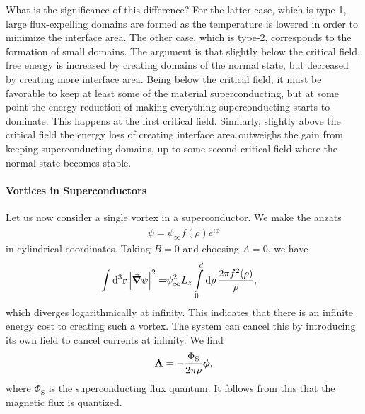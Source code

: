 What is the significance of this difference? For the latter case, which is type-1, large flux-expelling domains are formed as the temperature is lowered in order to minimize the interface area. The other case, which is type-2, corresponds to the formation of small domains. The argument is that slightly below the critical field, free energy is increased by creating domains of the normal state, but decreased by creating more interface area. Being below the critical field, it must be favorable to keep at least some of the material superconducting, but at some point the energy reduction of making everything superconducting starts to dominate. This happens at the first critical field. Similarly, slightly above the critical field the energy loss of creating interface area outweighs the gain from keeping superconducting domains, up to some second critical field where the normal state becomes stable.

\paragraph{Vortices in Superconductors}
Let us now consider a single vortex in a superconductor. We make the anzats
\begin{align*}
	\psi = \psi_{\infty}f(\rho)e^{i\phi}
\end{align*}
in cylindrical coordinates. Taking $B = 0$ and choosing $A = 0$, we have
\begin{align*}
	\int\limits_{}^{}\dd[3]{\vb{r}}\abs{\grad{\psi}}^{2} =& \psi_{\infty}^{2}L_{z}\int\limits_{0}^{d}\dd{\rho}\frac{2\pi f^{2}(\rho)}{\rho},
\end{align*}
which diverges logarithmically at infinity. This indicates that there is an infinite energy cost to creating such a vortex. The system can cancel this by introducing its own field to cancel currents at infinity. We find
\begin{align*}
	\vb{A} = -\frac{\Phi_{\text{S}}}{2\pi\rho}\vb*{\phi},
\end{align*}
where $\Phi_{\text{S}}$ is the superconducting flux quantum. It follows from this that the magnetic flux is quantized.

